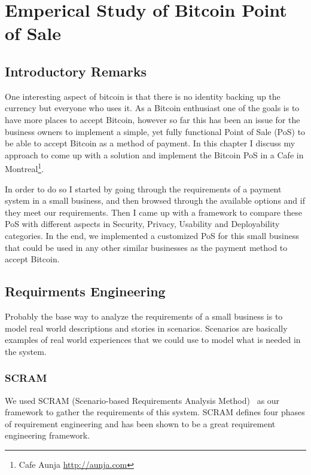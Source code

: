 
\chapter{Emperical Study of Bitcoin Point of Sale}


\section{Introductory Remarks}

One interesting aspect of bitcoin is that there is no identity backing up the currency but everyone who uses it. As a Bitcoin enthusiast one of the goals is to have more places to accept Bitcoin, however so far this has been an issue for the business owners to implement a simple, yet fully functional Point of Sale (PoS) to be able to accept Bitcoin as a method of payment.
In this chapter I discuss my approach to come up with a solution and implement the Bitcoin PoS in a Cafe in Montreal\footnote{ Cafe Aunja \url{http://aunja.com}}.

In order to do so I started by going through the requirements of a payment system in a small business, and then browsed through the available options and if they meet our requirements. Then I came up with a framework to compare these PoS with different aspects in Security, Privacy, Usability and Deployability categories. In the end, we implemented a customized PoS for this small business that could be used in any other similar businesses as the payment method to accept Bitcoin.

\section {Requirments Engineering}
Probably the base way to analyze the requirements of a small business is to model real world descriptions and stories in scenarios. Scenarios are basically examples of real world experiences that we could use to model what is needed in the system. 

\subsection{SCRAM}
We used SCRAM (Scenario-based Requirements Analysis Method)~\cite{REScenario} as our framework to gather the requirements of this system.
SCRAM defines four phases of requirement engineering and has been shown to be a great requirement engineering framework.


